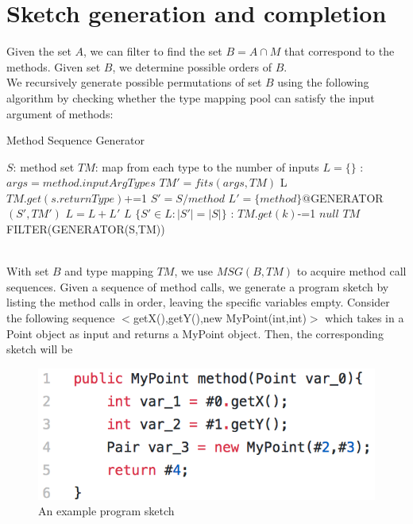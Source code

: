 \documentclass[twocolumn]{article}
\begin{document}
\section{Sketch generation and completion}
Given the set $A$, we can filter to find the set $B = A \cap M$ that correspond to the methods. Given set $B$, we determine possible orders of $B$. \\

We recursively generate possible permutations of set $B$ using the following algorithm by checking whether the type mapping pool can satisfy the input argument of methods:
\begin{algorithm}
\caption{Method Sequence Generator}\label{euclid}
\begin{algorithmic}
\State $S$: method set
\State $TM$: map from each type to the number of inputs
\State $L=\{\}$
:
\State $args=method.inputArgTypes$
\State $TM'=fits(args,TM)$
 \Return L \EndIf
{}
\State $TM.get(s.returnType)$+=1
\EndIf
\State $S'=S/method$
\State $L'=\{method\}@$GENERATOR$(S',TM')$
\State $L=L+L'$
\EndFor
\State \Return $L$
\EndFunction
{}
\State \Return $\{S'\in L:|S'|=|S|\}$
\EndFunction
{}
:
\State $TM.get(k)$-=1
\Else
\State \Return $null$
\EndIf
\EndFor
\State \Return $TM$
\EndFunction
\State
\Return FILTER(GENERATOR(S,TM))
\EndProcedure
\end{algorithmic}
\end{algorithm}
\\
With set $B$ and type mapping $TM$, we use $MSG(B,TM)$ to acquire method call sequences. Given a sequence of method calls, we generate a program sketch by listing the method calls in order, leaving the specific variables empty. Consider the following sequence $<$getX(),getY(),new MyPoint(int,int)$>$ which takes in a Point object as input and returns a MyPoint object. Then, the corresponding sketch will be\\
\begin{figure}[h]
\centering
\includegraphics[scale = 0.7]{sketchcompeg.png}
\caption{An example program sketch}
\end{figure}\\
\end{document}
